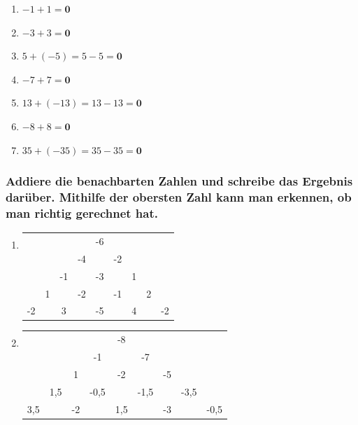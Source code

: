 \documentclass[a4paper,12pt]{article} %
\begin{document}
\begin{enumerate}
  \item \(-1 + 1 = \mathbf{0}\) %

  \item \(-3 + 3 = \mathbf{0}\) %

  \item \(5 + (-5) = 5 - 5 = \mathbf{0}\) %

  \item \(-7 + 7 = \mathbf{0}\) %

  \item \(13 + (-13) = 13 - 13 = \mathbf{0}\) %

  \item \(-8 + 8 = \mathbf{0}\) %

  \item \(35 + (-35) = 35 - 35 = \mathbf{0}\) %

\end{enumerate}

\subsubsection{Addiere die benachbarten Zahlen und schreibe das Ergebnis darüber.
Mithilfe der obersten Zahl kann man erkennen, ob man richtig gerechnet hat.} %

\begin{enumerate}[label=\alph*)]

  \item %
  \vspace{1cm}
  \begin{center}
    \begin{tabular}{c c c c c c c c c}
      & & & & -6 & & & & \\
      & & & -4 & & -2 & & & \\
      & & -1 & & -3 & & 1 & & \\
      & 1 & & -2 & & -1 & & 2 & \\
      -2 & & 3 & & -5 & & 4 & & -2 \\
    \end{tabular}
  \end{center}

  \item %
  \vspace{1cm}
  \begin{center}
    \begin{tabular}{c c c c c c c c c}
      & & & & -8 & & & & \\
      & & & -1 & & -7 & & & \\
      & & 1 & & -2 & & -5 & \\
      & 1,5 & & -0,5 & & -1,5 & & -3,5 & \\
      3,5 & & -2 & & 1,5 & & -3 & & -0,5 \\
    \end{tabular}
  \end{center}

\end{enumerate}
\vspace{1cm}
\end{document}
